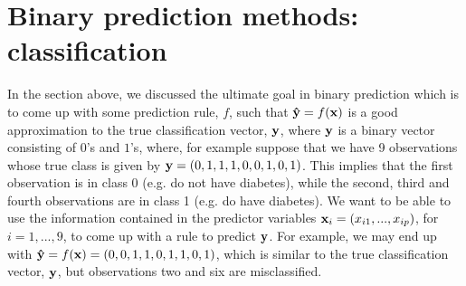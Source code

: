 \section{Binary prediction methods: classification}

In the section above, we discussed the ultimate goal in binary prediction which is to come up with some prediction rule, $f$, such that ${\bf \hat{y}} = f({\bf x})$ is a good approximation to the true classification vector, ${\bf y}$, where ${\bf y}$ is a binary vector consisting of $0$'s and $1$'s, where, for example suppose that we have 9 observations whose true class is given by ${\bf y} = (0, 1, 1, 1, 0, 0, 1, 0, 1)$. This implies that the first observation is in class 0 (e.g. do not have diabetes), while the second, third and fourth observations are in class 1 (e.g. do have diabetes). We want to be able to use the information contained in the predictor variables ${\bf x}_i = (x_{i1}, ..., x_{ip})$, for $i = 1, ..., 9$, to come up with a rule to predict ${\bf y}$. For example, we may end up with ${\bf \hat{y}} = f({\bf x}) = (0, 0, 1, 1, 0, 1, 1, 0, 1)$, which is similar to the true classification vector, ${\bf y}$, but observations two and six are misclassified.





